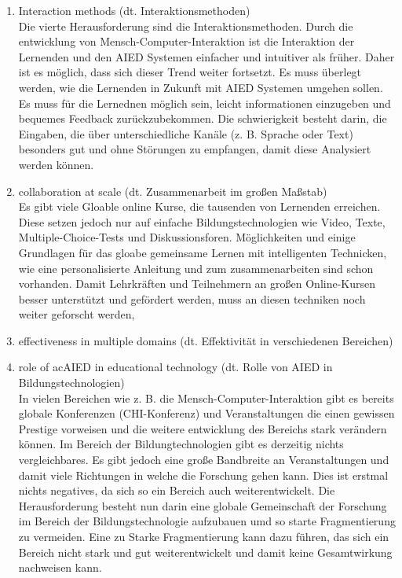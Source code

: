 \begin{enumerate}
    \item Interaction methods (dt. Interaktionsmethoden) \\
    Die vierte Herausforderung sind die Interaktionsmethoden. Durch die entwicklung von Mensch-Computer-Interaktion ist die Interaktion der Lernenden und den AIED Systemen einfacher und intuitiver als früher.
    Daher ist es möglich, dass sich dieser Trend weiter fortsetzt. Es muss überlegt werden, wie die Lernenden in Zukunft mit AIED Systemen umgehen sollen.
    Es muss für die Lernednen möglich sein, leicht informationen einzugeben und bequemes Feedback zurückzubekommen. Die schwierigkeit besteht darin, die Eingaben, die über unterschiedliche Kanäle (z. B. Sprache oder Text) besonders gut und ohne Störungen zu empfangen, damit diese Analysiert werden können.


    \item collaboration at scale (dt. Zusammenarbeit im großen Maßstab) \\
    Es gibt viele Gloable online Kurse, die tausenden von Lernenden erreichen. Diese setzen jedoch nur auf einfache Bildungstechnologien wie Video, Texte, Multiple-Choice-Tests und Diskussionsforen.
    Möglichkeiten und einige Grundlagen für das gloabe gemeinsame Lernen mit intelligenten Technicken, wie eine personalisierte Anleitung und zum zusammenarbeiten sind schon vorhanden. 
    Damit Lehrkräften und Teilnehmern an großen Online-Kursen besser unterstützt und gefördert werden, muss an diesen techniken noch weiter geforscht werden,
    
    \item effectiveness in multiple domains (dt. Effektivität in verschiedenen Bereichen) \\
    
    \item role of ac{AIED} in educational technology (dt. Rolle von \ac{AIED} in Bildungstechnologien) \\
    In vielen Bereichen wie z. B. die Mensch-Computer-Interaktion gibt es bereits globale Konferenzen (CHI-Konferenz) und Veranstaltungen die einen gewissen Prestige vorweisen und die weitere entwicklung des Bereichs stark verändern können.
    Im Bereich der Bildungtechnologien gibt es derzeitig nichts vergleichbares. Es gibt jedoch eine große Bandbreite an Veranstaltungen und damit viele Richtungen in welche die Forschung gehen kann. Dies ist erstmal nichts negatives, da sich so ein Bereich auch weiterentwickelt.
    Die Herausforderung besteht nun darin eine globale Gemeinschaft der Forschung im Bereich der Bildungstechnologie aufzubauen umd so starte Fragmentierung zu vermeiden.
    Eine zu Starke Fragmentierung kann dazu führen, das sich ein Bereich nicht stark und gut weiterentwickelt und damit keine Gesamtwirkung nachweisen kann.
\end{enumerate} 


